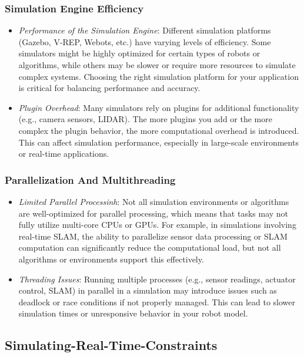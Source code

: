 \documentclass[../../main]{subfiles}
\begin{document}
    \subsubsection{Simulation Engine Efficiency}
    \begin{itemize}
    \item
      \emph{Performance of the Simulation Engine}: Different simulation
      platforms (Gazebo, V-REP, Webots, etc.) have varying levels of
      efficiency. Some simulators might be highly optimized for certain
      types of robots or algorithms, while others may be slower or require
      more resources to simulate complex systems. Choosing the right
      simulation platform for your application is critical for balancing
      performance and accuracy.
    \item
      \emph{Plugin Overhead}: Many simulators rely on plugins for
      additional functionality (e.g., camera sensors, LIDAR). The more
      plugins you add or the more complex the plugin behavior, the more
      computational overhead is introduced. This can affect simulation
      performance, especially in large-scale environments or real-time
      applications.
    \end{itemize}
    
    \subsubsection{Parallelization And Multithreading}
    \begin{itemize}
    \item
      \emph{Limited Parallel Processinh}: Not all simulation environments
      or algorithms are well-optimized for parallel processing, which means
      that tasks may not fully utilize multi-core CPUs or GPUs. For example,
      in simulations involving real-time SLAM, the ability to parallelize
      sensor data processing or SLAM computation can significantly reduce
      the computational load, but not all algorithms or environments support
      this effectively.
    \item
      \emph{Threading Issues}: Running multiple processes (e.g., sensor
      readings, actuator control, SLAM) in parallel in a simulation may
      introduce issues such as deadlock or race conditions if not properly
      managed. This can lead to slower simulation times or unresponsive
      behavior in your robot model.
    \end{itemize}
    
    \subsection{Simulating-Real-Time-Constraints}
    
\end{document}
